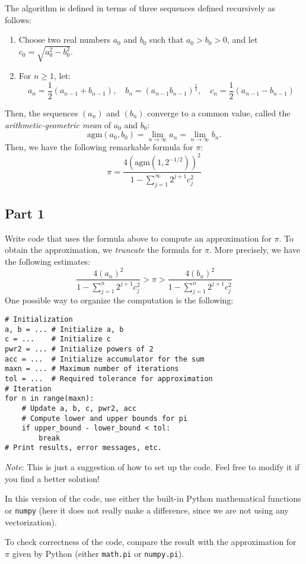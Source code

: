 \documentclass[12pt]{article}
\begin{document}
The algorithm is defined in terms of three sequences defined recursively as follows:
\begin{enumerate}
\item Choose two real numbers $a_0$ and $b_0$ such that $a_0>b_0>0$, and let $c_0=\sqrt{a_0^2-b_0^2}$.
\item For $n \ge 1$, let:
\[
a_n=\frac{1}{2}(a_{n-1}+b_{n-1}),\quad b_n=(a_{n-1}b_{n-1})^{\frac{1}{2}},\quad c_n=\frac{1}{2}(a_{n-1}-b_{n-1})
\]
\end{enumerate}
Then, the sequences $(a_n)$ and $(b_n)$ converge to a common value, called the \emph{arithmetic-geometric mean} of $a_0$ and $b_0$:
\[
\text{agm}(a_0,b_0)=\lim_{n\to\infty}a_n=\lim_{n\to\infty}b_n.
\]
Then, we have the following remarkable formula for $\pi$:
\[
\pi=\frac{4\left(\text{agm}\left(1,2^{-1/2}\right)\right)^2}
{1-\sum_{j=1}^{\infty}2^{j+1}c_j^2}
\]

\subsection{Part 1} 

Write code that uses the formula above to compute an approximation for $\pi$. To obtain the approximation, we \emph{truncate} the formula for $\pi$. More precisely, we have the following estimates:
\[
\frac{4(a_n)^2}{1-\sum_{j=1}^{n}2^{j+1}c_j^2}>\pi>
\frac{4(b_n)^2}{1-\sum_{j=1}^{n}2^{j+1}c_j^2}
\]
One possible way to organize the computation is the following:
\begin{lstlisting}
# Initialization
a, b = ... # Initialize a, b
c = ...    # Initialize c
pwr2 = ... # Initialize powers of 2
acc = ...  # Initialize accumulator for the sum
maxn = ... # Maximum number of iterations
tol = ...  # Required tolerance for approximation
# Iteration
for n in range(maxn):
	# Update a, b, c, pwr2, acc
	# Compute lower and upper bounds for pi
	if upper_bound - lower_bound < tol:
		break
# Print results, error messages, etc.
\end{lstlisting}
\emph{Note}: This is just a suggestion of how to set up the code. Feel free to modify it if you find a better solution!

In this version of the code, use either the built-in Python mathematical functions or \texttt{numpy} (here it does not really make a difference, since we are not using any vectorization).

To check correctness of the code, compare the result with the approximation for $\pi$ given by Python (either \texttt{math.pi} or \texttt{numpy.pi}).
\end{document}
